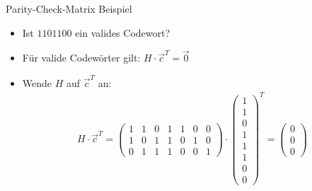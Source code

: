 \documentclass[11pt%
,aspectratio=169%
]{beamer}
\begin{document}
\begin{frame}{Parity-Check-Matrix Beispiel}
    \begin{itemize}
        \item Ist $1101100$ ein valides Codewort?
        \item Für valide Codewörter gilt: $H\cdot \Vec{c}^T = \Vec{0}$ 
        \item Wende $H$ auf $\Vec{c}^T$ an:
        \begin{align*}
            H \cdot \vec{c}^T =
             \begin{pmatrix}
		            1 & 1 & 0 & 1 & 1 & 0 & 0 \\
		            1 & 0 & 1 & 1 & 0 & 1 & 0 \\
		            0 & 1 & 1 & 1 & 0 & 0 & 1 
		    \end{pmatrix} \cdot
		    \begin{pmatrix}
                1\\1\\0\\1\\1\\1\\0\\0 
		    \end{pmatrix}^T =
		    \begin{pmatrix}
		       0\\0\\0
		    \end{pmatrix}
        \end{align*}

    \end{itemize}
\end{frame}
\end{document}
